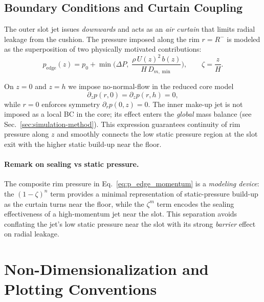 \documentclass[11pt,a4paper]{article}
\begin{document}
\subsection{Boundary Conditions and Curtain Coupling} \label{sec:boundaryconditions}
The outer slot jet issues \emph{downwards} and acts as an \emph{air curtain} that
limits radial leakage from the cushion. The pressure imposed along the rim
$r=R^{-}$ is modeled as the superposition of two physically motivated
contributions:
\begin{equation}
  p_{\mathrm{edge}}(z)=p_0 + \min\!\Big(\Delta P,\;\frac{\rho\,U(z)^2\,b(z)}{H\,D_{m,\min}}\Big),\qquad \zeta=\frac{z}{H}.
  \label{eq:p_edge_momentum}
\end{equation}

On $z=0$ and $z=h$ we impose no-normal-flow in the reduced core model
\begin{equation}
  \partial_z p(r,0)=\partial_z p(r,h)=0,
\end{equation}
while $r=0$ enforces symmetry $\partial_r p(0,z)=0$. The inner make-up jet is not
imposed as a local BC in the core; its effect enters the \emph{global} mass balance
(see Sec.~\ref{sec:simulation-method}).
This expression guarantees continuity of rim pressure along $z$ and smoothly connects
the low static pressure region at the slot exit with the higher static build-up near the
floor.

\paragraph{Remark on sealing vs static pressure.}
The composite rim pressure in Eq.~\eqref{eq:p_edge_momentum} is a
\emph{modeling device}: the $(1-\zeta)^n$ term provides a minimal representation
of static-pressure build-up as the curtain turns near the floor, while the
$\zeta^m$ term encodes the sealing effectiveness of a high-momentum jet near the slot.
This separation avoids conflating the jet's low static pressure near the slot with
its strong \emph{barrier} effect on radial leakage.

\section{Non-Dimensionalization and Plotting Conventions}
\label{sec:non-dimensionalization-and-plotting-conventions}
\end{document}
